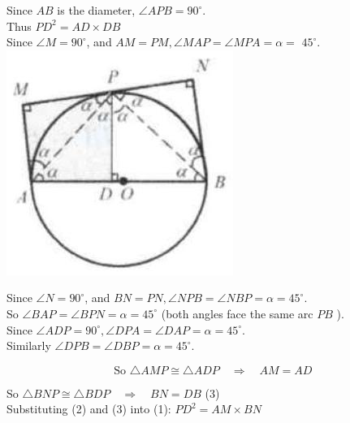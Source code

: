 \documentclass{article}
\begin{document}
Since \(A B\) is the diameter, \(\angle A P B=90^{\circ}\).\\
Thus \(P D^{2}=A D \times D B\)\\
Since \(\angle M=90^{\circ}\), and \(A M=P M, \angle M A P=\angle M P A=\alpha=\) \(45^{\circ}\).\\
\centering
\includegraphics[width=\textwidth]{images/reasoning_image_1.jpg}


Since \(\angle N=90^{\circ}\), and \(B N=P N, \angle N P B=\angle N B P=\alpha=45^{\circ}\).\\
So \(\angle B A P=\angle B P N=\alpha=45^{\circ}\) (both angles face the same arc \(P B\) ).\\
Since \(\angle A D P=90^{\circ}, \angle D P A=\angle D A P=\alpha=45^{\circ}\).\\
Similarly \(\angle D P B=\angle D B P=\alpha=45^{\circ}\).

\[
\text { So } \triangle A M P \cong \triangle A D P \quad \Rightarrow \quad A M=A D
\]

So \(\triangle B N P \cong \triangle B D P \quad \Rightarrow \quad B N=D B\) (3)\\
Substituting (2) and (3) into (1): \(P D^{2}=A M \times B N\)\\
\end{document}
